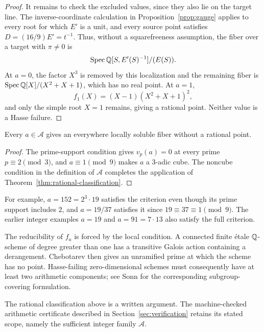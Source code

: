 \begin{proof}
It remains to check the excluded values, since they also lie on the
target line.  The inverse-coordinate calculation in
Proposition~\ref{prop:gauge} applies to every root for which \(E'\) is
a unit, and every source point satisfies
\(D=(16/9)E'=t^{-1}\).  Thus, without a squarefreeness assumption, the
fiber over a target with \(\pi\ne0\) is
\[
 \operatorname{Spec}\mathbb Q[S,E'(S)^{-1}]/(E(S)).
\]
At \(a=0\), the factor \(X^3\) is removed by this localization and
the remaining fiber is \(\operatorname{Spec}\mathbb Q[X]/(X^2+X+1)\), which has no real
point.  At \(a=1\),
\[
 f_1(X)=(X-1)(X^2+X+1)^2,
\]
and only the simple root \(X=1\) remains, giving a rational point.
Neither value is a Hasse failure.
\end{proof}

\begin{corollary}\label{cor:sufficient-family}
Every \(a\in\mathcal A\) gives an everywhere locally soluble fiber
without a rational point.
\end{corollary}

\begin{proof}
The prime-support condition gives \(v_p(a)=0\) at every prime
\(p\equiv2\pmod3\), and \(a\equiv1\pmod9\) makes \(a\) a
\(3\)-adic cube.  The noncube condition in the definition of
\(\mathcal A\) completes the application of
Theorem~\ref{thm:rational-classification}.
\end{proof}

For example, \(a=152=2^3\cdot19\) satisfies the criterion even though
its prime support includes \(2\), and \(a=19/37\) satisfies it since
\(19\equiv37\equiv1\pmod9\).  The earlier integer examples
\(a=19\) and \(a=91=7\cdot13\) also satisfy the full criterion.

\begin{remark}
The reducibility of \(f_a\) is forced by the local condition.  A connected
finite \'etale \(\mathbb Q\)-scheme of degree greater than one has a transitive
Galois action containing a derangement.  Chebotarev then gives an unramified
prime at which the scheme has no point.  Hasse-failing zero-dimensional
schemes must consequently have at least two arithmetic components; see
Sonn \cite{Sonn} for the corresponding subgroup-covering formulation.
\end{remark}

\begin{remark}
The rational classification above is a written argument.  The
machine-checked arithmetic certificate described in
Section~\ref{sec:verification} retains its stated scope, namely the
sufficient integer family \(\mathcal A\).
\end{remark}

